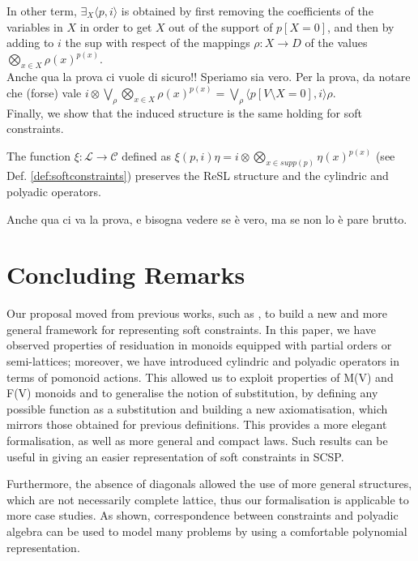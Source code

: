 \documentclass{llncs}
\begin{document}
In other term, $\exists_X \langle p, i \rangle$ is obtained by first removing the coefficients of the variables in $X$
in order to get $X$ out of the support of $p[X = 0]$, and then by adding to $i$ the sup with respect of the 
mappings $\rho: X \rightarrow D$ of the values $\bigotimes_{x \in X} \rho(x)^{p(x)}$.
\\

Anche qua la prova ci vuole di sicuro!! Speriamo sia vero. Per la prova, 
da notare che (forse) vale
$i \otimes \bigvee_{\rho} \bigotimes_{x \in X} \rho(x)^{p(x)} 
=
\bigvee_{\rho} \langle p[V\setminus X = 0], i \rangle \rho$.
\\

Finally, we show that the induced structure is the same holding for soft constraints.

\begin{proposition}
The function $\xi: \mathcal{L} \rightarrow \mathcal{C}$ defined as
$\xi(p,i)\eta = i \otimes \bigotimes_{x \in supp(p)} \eta(x)^{p(x)}$
(see Def. \ref{def:softconstraints})
preserves the ReSL structure and the cylindric and polyadic operators.
\end{proposition}

Anche qua ci va la prova, e bisogna vedere se \`e vero, ma se non lo \`e pare brutto.

\section{Concluding Remarks}\label{sec:conclusion}
Our proposal moved from previous works, such as \cite{ipl17,jlamp17}, to build a new and more general
framework for representing soft constraints. In this paper, we have observed properties of residuation
in monoids equipped with partial orders or semi-lattices; moreover, we have introduced cylindric
and polyadic operators in terms of pomonoid actions. This allowed us to exploit
properties of M(V) and F(V) monoids and to generalise the notion of substitution,
by defining any possible function as a substitution and building a new axiomatisation,
which mirrors those obtained for previous definitions.
This provides a more elegant formalisation, as well as more general and compact laws.
Such results can be useful in giving an easier representation of soft constraints in SCSP.

Furthermore, the absence of diagonals allowed the use of more general structures, which are not 
necessarily complete lattice, thus our formalisation is applicable to more case studies.
As shown, correspondence between constraints and polyadic algebra can be used to model
many problems by using a comfortable polynomial representation. 
\end{document}
